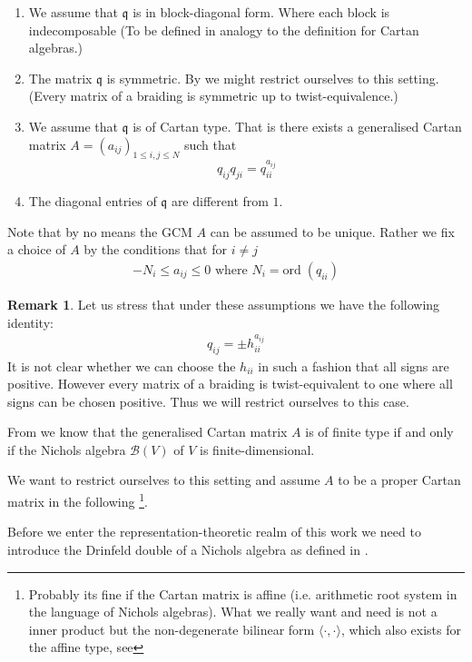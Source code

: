 \documentclass{amsart}
\theoremstyle{definition}
\newtheorem*{remark}{Remark}
\newcommand{\Nichols}[1]{\ensuremath{\mathcal{B}(#1)}}
\begin{document}
\begin{enumerate}
	\item We assume that $\mathfrak q$ is in block-diagonal form. Where each block is indecomposable (To be defined in analogy to the definition for Cartan algebras.)
	\item The matrix $\mathfrak q$ is symmetric.
	By \cite[Prop. 3.9]{Andruskiewitsch2002} we might restrict ourselves to this setting.(Every matrix of a braiding is symmetric up to twist-equivalence.)
	\item We assume that $\mathfrak q$ is of Cartan type. 
	That is there exists a generalised Cartan matrix $A = (a_{ij})_{1 \leq i,j \leq N}$ such that
	$$
		q_{ij}q_{ji}=q_{ii}^{a_{ij}}
	$$ 
	\item The diagonal entries of $\mathfrak q$ are different from $1$.
\end{enumerate}

Note that by no means the GCM $A$ can be assumed to be unique. Rather we fix a choice of $A$ by the conditions that for $i\neq j$
\begin{align}
	-N_i \leq a_{ij}\leq 0  \text{ where } N_i = \text{ord} \; (q_{ii})
\end{align}

\begin{remark}
	Let us stress that under these assumptions we have the following identity:
	\begin{align}
		q_{ij}= \pm h_{ii}^{a_{ij}}
	\end{align}
	It is not clear whether we can choose the $h_{ii}$ in such a fashion that all signs are positive.
	However every matrix of a braiding is twist-equivalent to one where all signs can be chosen positive. Thus we will restrict ourselves to this case.
\end{remark}

From \cite[Theorem 2.16]{Andruskiewitsch2017} we know that 
the generalised Cartan matrix $A$ is of finite type if and only if the Nichols algebra $\Nichols V$ of $V$ is finite-dimensional.

We want to restrict ourselves to this setting and assume $A$ to be a proper Cartan matrix in the following 
\footnote{Probably its fine if the Cartan matrix is affine (i.e. arithmetic root system in the language of Nichols algebras). What we really want and need is not a inner product but the non-degenerate bilinear form $\langle \cdot, \cdot \rangle $, which also exists for the affine type, see\cite{Kumar2002}}.

Before we enter the representation-theoretic realm of this work we need to introduce the Drinfeld double of a Nichols algebra as defined in \cite{Andruskiewitsch2010}.
\end{document}

